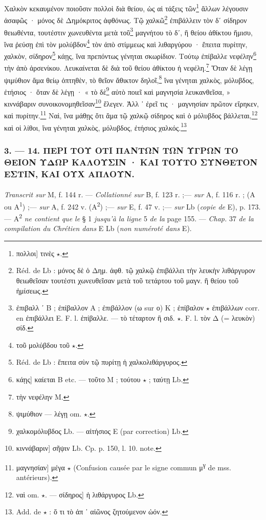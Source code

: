 \documentclass[a4paper, 11pt, oneside, polutonikogreek, french]{article}
\begin{document}
\bigskip

Χαλκὸν κεκαυμένον ποιοῦσιν πολλοὶ διὰ θείου, ὡς αἱ τάξεις τῶν\footnote{πολλοι] τινὲς $\star$.} ἄλλων λέγουσιν ἀσαφῶς · μόνος δὲ Δημόκριτος ἀφθόνως. Τῷ χαλκῶ\footnote{Réd. de Lb : μόνος δὲ ὁ Δημ. ἀφθ. τῷ χαλκῷ ἐπιβάλλει τὴν λευκὴν λιθάργυρον θειωθεῖσαν τουτέστι χωνευθεῖσαν μετὰ τοῦ τετάρτου τοῦ μαγν. ἢ θείου τοῦ ἡμίσεως.} ἐπιβάλλειν τὸν δʹ σίδηρον θειωθέντα, τουτέστιν χωνευθέντα μετὰ τοῦ\footnote{ἐπιβαλλ ʹ B ; ἐπίβαλλον A ; ἐπιβάλλον (ω sur ο) K ; ἐπίβαλον $\star$ ἐπιβάλλων corr. en ἐπιβάλλει E. F. l. ἐπίβαλλε. --- τὸ τέταρτον ἢ σιδ. $\star$. F. l. τὸν Δ (= λευκὸν) σίδ.} μαγνήτου τὸ δʹ, ἢ θείου ἀθίκτου ἥμισυ, ἵνα ῥεύσῃ ἐπὶ τὸν μολύβδον\footnote{τοῦ μολύβδου τοῦ $\star$.} τὸν ἀπὸ στίμμεως καὶ λιθαργύρου · ἔπειτα πυρίτην, χαλκὸν, σίδηρον\footnote{Réd. de Lb : ἔπειτα σὺν τῷ πυρίτῃ ἡ χαλκολιθάργυρος.} κάῃς, ἵνα πρεπόντως γένηται σκωρίδιον. Τούτῳ ἐπίβαλλε νεφέλην\footnote{κάῃς] καίεται B etc. --- τοῦτο M ; τούτου $\star$ ; ταύτῃ Lb.} τὴν ἀπὸ ἀρσενίκου. Λευκαίνεται δὲ διὰ τοῦ θείου ἀθίκτου ἡ νεφέλη.\footnote{τὴν νεφέλην M.} Ὅταν δὲ λέγῃ ψιμύθιον ἅμα θείῳ ὀπτηθὲν, τὸ θεῖον ἄθικτον δηλοῖ,\footnote{ψιμύθιον --- λέγῃ om. $\star$.} ἵνα γένηται χαλκὸς, μόλυβδος, ἐτήσιος · ὅταν δὲ λέγῃ · « τὸ δὲ\footnote{χαλκομόλυβδος Lb. --- αἰτήσιος E (par correction) Lb.} αὐτὸ ποιεῖ καὶ μαγνησία λευκανθεῖσα, » κιννάβαριν συνοικονομηθεῖσαν\footnote{κιννάβαριν] σῆψιν Lb. Cp. p. 150, l. 10. note.} ἔλεγεν. Ἀλλ ᾽ ἐρεῖ τις · μαγνησίαν πρῶτον εἴρηκεν, καὶ πυρίτην.\footnote{μαγνησίαν] μέγα $\star$ (Confusion causée par le signe commun μ\textsuperscript{γ} de mss. antérieurs).} Ναὶ, ἵνα μάθῃς ὅτι ἅμα τῷ χαλκῷ σίδηρος καὶ ὁ μόλυβδος βάλλεται,\footnote{ναὶ om. $\star$. --- σίδηρος] ἡ λιθάργυρος Lb.} καὶ οἱ λίθοι, ἵνα γένηται χαλκὸς, μόλυβδος, ἐτήσιος χαλκός.\footnote{Add. de $\star$ : ὅ τι τὸ ἀπ ᾽ αἰῶνος ζητούμενον ὠόν.}

\bigskip
\centerline{\EightStarTaper}
\centerline{\EightStarTaper\EightStarTaper}
\bigskip

\subsubsection{3. --- 14. ΠΕΡΙ ΤΟΥ ΟΤΙ ΠΑΝΤΩΝ ΤΩΝ ΥΓΡΩΝ ΤΟ ΘΕΙΟΝ ΥΔΩΡ ΚΑΛΟΥΣΙΝ · ΚΑΙ ΤΟΥΤΟ ΣΥΝΘΕΤΟΝ ΕΣΤΙΝ, ΚΑΙ ΟΥΧ ΑΠΛΟΥΝ.}
\paragraph{}
\emph{Transcrit sur} M, f. 144 r. --- \emph{Collationné sur} B, f. 123 r. ;--- \emph{sur} A, f. 116 r. ; (A ou A\textsuperscript{1}) ;--- \emph{sur} A, f. 242 v. (A\textsuperscript{2}) ;--- \emph{sur} E, f. 47 v. ;--- \emph{sur} Lb (\emph{copie de} E), p. 173. --- A\textsuperscript{2} \emph{ne contient que le} § 1 \emph{jusqu'à la ligne} 5 \emph{de la} page 155. --- \emph{Chap.} 37 \emph{de la compilation du Chrétien dans} E Lb (\emph{non numéroté dans} E).
\end{document}
